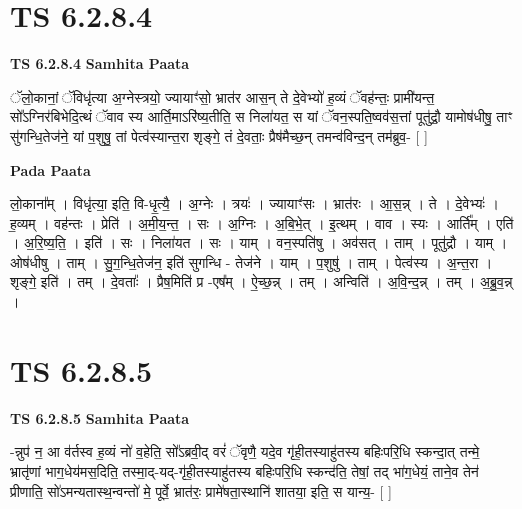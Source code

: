 \documentclass[17pt]{extarticle}
\begin{document}
\section*{ TS 6.2.8.4 }

\textbf{TS 6.2.8.4 } \newline
\textbf{Samhita Paata} \newline

ॅलो॒कानां॒ ॅविधृ॑त्या अ॒ग्नेस्त्रयो॒ ज्यायाꣳ॑सो॒ भ्रात॑र आस॒न् ते दे॒वेभ्यो॑ ह॒व्यं ॅवह॑न्तः॒ प्रामी॑यन्त॒ सो᳚ऽग्निर॑बिभेदि॒त्थं ॅवाव स्य आर्ति॒माऽरि॑ष्य॒तीति॒ स निला॑यत॒ स यां ॅवन॒स्पति॒ष्वव॑स॒त्तां पूतु॑द्रौ॒ यामोष॑धीषु॒ ताꣳ सु॑गन्धि॒तेज॑ने॒ यां प॒शुषु॒ तां पेत्व॑स्यान्त॒रा शृङ्गे॒ तं दे॒वताः॒ प्रैष॑मैच्छ॒न् तमन्व॑विन्द॒न् तम॑ब्रुव॒- [  ] \newline

\textbf{Pada Paata} \newline

लो॒काना᳚म् । विधृ॑त्या॒ इति॒ वि-धृ॒त्यै॒ । अ॒ग्नेः । त्रयः॑ । ज्यायाꣳ॑सः । भ्रात॑रः । आ॒स॒न्न् । ते । दे॒वेभ्यः॑ । ह॒व्यम् । वह॑न्तः । प्रेति॑ । अ॒मी॒य॒न्त॒ । सः । अ॒ग्निः । अ॒बि॒भे॒त् । इ॒त्थम् । वाव । स्यः । आर्ति᳚म् । एति॑ । अ॒रि॒ष्य॒ति॒ । इति॑ । सः । निला॑यत । सः । याम् । वन॒स्पति॑षु । अव॑सत् । ताम् । पूतु॑द्रौ । याम् । ओष॑धीषु । ताम् । सु॒ग॒न्धि॒तेज॑न॒ इति॑ सुगन्धि - तेज॑ने । याम् । प॒शुषु॑ । ताम् । पेत्व॑स्य । अ॒न्त॒रा । शृङ्गे॒ इति॑ । तम् । दे॒वताः᳚ । प्रैष॒मिति॑ प्र -एष᳚म् । ऐ॒च्छ॒न्न् । तम् । अन्विति॑ । अ॒वि॒न्द॒न्न् । तम् । अ॒ब्रु॒व॒न्न् ।  \newline




\section*{ TS 6.2.8.5 }

\textbf{TS 6.2.8.5 } \newline
\textbf{Samhita Paata} \newline

-न्नुप॑ न॒ आ व॑र्तस्व ह॒व्यं नो॑ व॒हेति॒ सो᳚ऽब्रवी॒द् वरं॑ ॅवृणै॒ यदे॒व गृ॑ही॒तस्याहु॑तस्य बहिःपरि॒धि स्कन्दा॒त् तन्मे॒ भ्रातृ॑णां भाग॒धेय॑मस॒दिति॒ तस्मा॒द्-यद्-गृ॑ही॒तस्याहु॑तस्य बहिःपरि॒धि स्कन्द॑ति॒ तेषां॒ तद् भा॑ग॒धेयं॒ ताने॒व तेन॑ प्रीणाति॒ सो॑ऽमन्यतास्थ॒न्वन्तो॑ मे॒ पूर्वे॒ भ्रात॑रः॒ प्रामे॑षता॒स्थानि॑ शातया॒ इति॒ स यान्य॒- [  ] \newline
\end{document}
